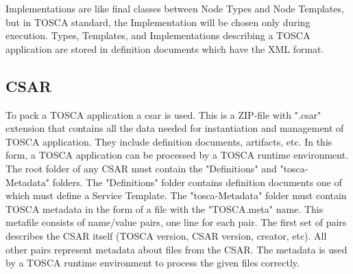 Implementations are like final classes between Node Types and Node Templates, but in TOSCA standard, the Implementation will be chosen only during execution.
Types, Templates, and Implementations describing a TOSCA application are stored in definition documents which have the XML format. %

%
\subsection*{CSAR} 
%
To pack a TOSCA application a \gls{csar}\label{sec:csar} is used.
This is a ZIP-file with ".csar" extension that contains all the data needed for instantiation and management of TOSCA application.
They include definition documents, artifacts, etc.
In this form, a TOSCA application can be processed by a TOSCA runtime environment.\\
The root folder of any CSAR must contain the "Definitions" and "\gls{tosca}-Metadata" folders.
The "Definitions" folder contains definition documents one of which must define a Service Template.
The "\gls{tosca}-Metadata" folder must contain TOSCA metadata in the form of a file with the "TOSCA.meta" name.
This metafile consists of name/value pairs, one line for each pair. 
The first set of pairs describes the CSAR itself (TOSCA version, CSAR version, creator, etc). 
All other pairs represent metadata about files from the CSAR. 
The metadata is used by a TOSCA runtime environment to process the given files correctly.
%
